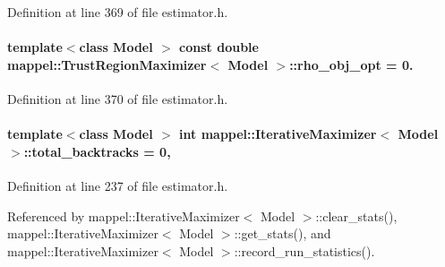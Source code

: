 Definition at line 369 of file estimator.\+h.

\paragraph[{\texorpdfstring{rho\+\_\+obj\+\_\+opt}{rho_obj_opt}}]{\setlength{\rightskip}{0pt plus 5cm}template$<$class Model $>$ const double {\bf mappel\+::\+Trust\+Region\+Maximizer}$<$ Model $>$\+::rho\+\_\+obj\+\_\+opt = 0.\hspace{0.3cm}{\ttfamily [static]}}\hypertarget{classmappel_1_1TrustRegionMaximizer_a493c379e980a954cd62e9bc12a614473}{}\label{classmappel_1_1TrustRegionMaximizer_a493c379e980a954cd62e9bc12a614473}


Definition at line 370 of file estimator.\+h.

\paragraph[{\texorpdfstring{total\+\_\+backtracks}{total_backtracks}}]{\setlength{\rightskip}{0pt plus 5cm}template$<$class Model $>$ int {\bf mappel\+::\+Iterative\+Maximizer}$<$ Model $>$\+::total\+\_\+backtracks = 0\hspace{0.3cm}{\ttfamily [protected]}, {\ttfamily [inherited]}}\hypertarget{classmappel_1_1IterativeMaximizer_a752717a4e69ba7cd44a6167d0cbdb242}{}\label{classmappel_1_1IterativeMaximizer_a752717a4e69ba7cd44a6167d0cbdb242}


Definition at line 237 of file estimator.\+h.



Referenced by mappel\+::\+Iterative\+Maximizer$<$ Model $>$\+::clear\+\_\+stats(), mappel\+::\+Iterative\+Maximizer$<$ Model $>$\+::get\+\_\+stats(), and mappel\+::\+Iterative\+Maximizer$<$ Model $>$\+::record\+\_\+run\+\_\+statistics().

